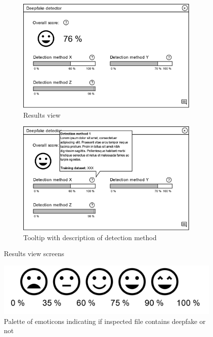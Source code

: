 \begin{figure}[H]
    \begin{subfigure}[h]{.498\linewidth}
        \centering
        \includegraphics[width=1\linewidth]{other-fig/client_wireframe_results.png}
        \caption{Results view}
    \end{subfigure}
    \hfill
    \begin{subfigure}[h]{.498\linewidth}
        \centering
        \includegraphics[width=1\linewidth]{other-fig/client_wireframe_results2.png}
        \caption{Tooltip with description of detection method}
    \end{subfigure} 
    \caption{Results view screens}
    \label{fig:client_wireframe_results}
\end{figure}

\begin{figure}[H]
    \centering
    \includegraphics[width=.5\linewidth]{other-fig/client_wireframe_results3.png}
    \caption{Palette of emoticons indicating if inspected file contains deepfake or not}
\label{fig:client_wireframe_results3}
\end{figure}

